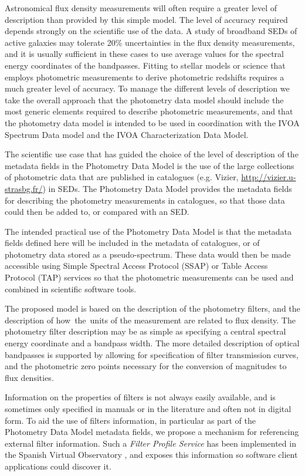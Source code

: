 \documentclass[11pt,a4paper]{ivoa}
\begin{document}
Astronomical flux density measurements will often require a 
greater level of description than provided by this simple model. 
The level of accuracy required depends strongly on the scientific 
use of the data. A study of broadband SEDs of active galaxies may 
tolerate 20$\%$  uncertainties in the flux density measurements, 
and it is usually sufficient in these cases to use average values 
for the spectral energy coordinates of the bandpasses. Fitting to 
stellar models or science that employs photometric measurements to 
derive photometric redshifts requires a much greater level of accuracy. 
To manage the different levels of description we take the overall 
approach that the photometry data model should include the most 
generic elements required to describe photometric measurements, 
and that the photometry data model is intended to be used in 
coordination with the IVOA Spectrum Data model and the IVOA 
Characterization Data Model.

The scientific use case that has guided the choice of the level 
of description of the metadata fields in the Photometry Data Model 
is the use of the large collections of photometric data that are 
published in catalogues (e.g. Vizier, \url{http://vizier.u-strasbg.fr/}) 
in SEDs. The Photometry Data Model provides the metadata fields for 
describing the photometry measurements in catalogues, so that those 
data could then be added to, or compared with an SED.

The intended practical use of the Photometry Data Model is that the 
metadata fields defined here will be included in the metadata of 
catalogues, or of photometry data stored as a pseudo-spectrum. These 
data would then be made accessible using Simple Spectral Access Protocol 
(SSAP) or Table Access Protocol (TAP) services so that the photometric 
measurements can be used and combined in scientific software tools.

The proposed model is based on the description of the photometry 
filters, and the description of how\ the\ units of the measurement 
are related to flux density. The photometry filter description may 
be as simple as specifying a central spectral energy coordinate and 
a bandpass width. The more detailed description of optical bandpasses 
is supported by allowing for specification of filter transmission 
curves, and the   photometric zero points necessary for the conversion 
of magnitudes to flux densities.

Information on the properties of filters is not always easily available, 
and is sometimes only specified in manuals or in the literature and often 
not in digital form. To aid the use of filters information, in particular 
as part of the Photometry Data Model metadata fields, we propose a 
mechanism for referencing external filter information. Such a 
\textit{Filter Profile Service} has been implemented in the Spanish Virtual Observatory
\citep{2012ivoa.rept.1015R}, \citep{2020sea..confE.182R} and exposes this information so software 
client applications could discover it. 
\end{document}

